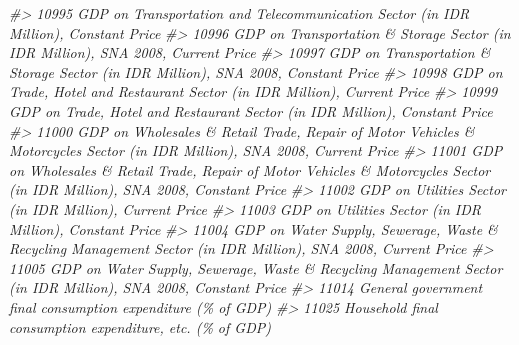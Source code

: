 \documentclass[
]{bxjsbook}
\newenvironment{Shaded}{\begin{snugshade}}{\end{snugshade}}
\newcommand{\CommentTok}[1]{\textcolor[rgb]{0.56,0.35,0.01}{\textit{#1}}}
\theoremstyle{definition}
\theoremstyle{definition}
\theoremstyle{definition}
\theoremstyle{definition}
\theoremstyle{remark}
\begin{document}
\begin{Shaded}
\begin{Highlighting}[]
\CommentTok{\#\textgreater{} 10995                                                                                       GDP on Transportation and Telecommunication Sector (in IDR Million), Constant Price}
\CommentTok{\#\textgreater{} 10996                                                                                          GDP on Transportation \& Storage Sector (in IDR Million), SNA 2008, Current Price}
\CommentTok{\#\textgreater{} 10997                                                                                         GDP on Transportation \& Storage Sector (in IDR Million), SNA 2008, Constant Price}
\CommentTok{\#\textgreater{} 10998                                                                                                 GDP on Trade, Hotel and Restaurant Sector (in IDR Million), Current Price}
\CommentTok{\#\textgreater{} 10999                                                                                                GDP on Trade, Hotel and Restaurant Sector (in IDR Million), Constant Price}
\CommentTok{\#\textgreater{} 11000                                                 GDP on Wholesales \& Retail Trade, Repair of Motor Vehicles \& Motorcycles Sector (in IDR Million), SNA 2008, Current Price}
\CommentTok{\#\textgreater{} 11001                                                GDP on Wholesales \& Retail Trade, Repair of Motor Vehicles \& Motorcycles Sector (in IDR Million), SNA 2008, Constant Price}
\CommentTok{\#\textgreater{} 11002                                                                                                                   GDP on Utilities Sector (in IDR Million), Current Price}
\CommentTok{\#\textgreater{} 11003                                                                                                                  GDP on Utilities Sector (in IDR Million), Constant Price}
\CommentTok{\#\textgreater{} 11004                                                              GDP on Water Supply, Sewerage, Waste \& Recycling Management Sector (in IDR Million), SNA 2008, Current Price}
\CommentTok{\#\textgreater{} 11005                                                             GDP on Water Supply, Sewerage, Waste \& Recycling Management Sector (in IDR Million), SNA 2008, Constant Price}
\CommentTok{\#\textgreater{} 11014                                                                                                               General government final consumption expenditure (\% of GDP)}
\CommentTok{\#\textgreater{} 11025                                                                                                                  Household final consumption expenditure, etc. (\% of GDP)}

\end{Highlighting}
\end{Shaded}
\end{document}
